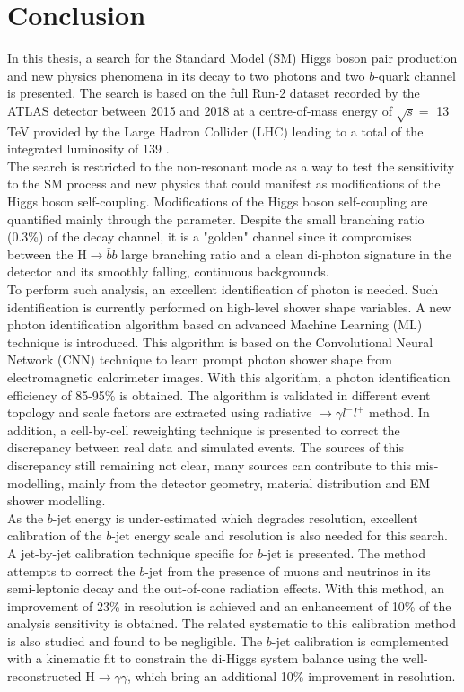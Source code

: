 \newpage
\chapter{Conclusion}

In this thesis, a search for the Standard Model (SM) Higgs boson pair production and new physics phenomena in its decay to two photons and two $b$-quark channel is presented. The search is based on the full Run-2 dataset recorded by the ATLAS detector between 2015 and 2018 at a centre-of-mass energy of $\sqrt{s} = $ 13 TeV provided by the Large Hadron Collider (LHC) leading to a total of the integrated luminosity of 139 \ifb.  \\

The search is restricted to the non-resonant mode as a way to test the sensitivity to the SM process and new physics that could manifest as modifications of the Higgs boson self-coupling. Modifications of the Higgs boson self-coupling are quantified mainly through the \kl parameter. Despite the small branching ratio (0.3\%) of the \bbyy decay channel, it is a "golden" channel since it compromises between the H$\to\bar{b}b$ large branching ratio and a clean di-photon signature in the detector and its smoothly falling, continuous backgrounds. \\

To perform such analysis, an excellent identification of photon is needed. Such identification is currently performed on high-level shower shape variables. A new photon identification algorithm based on advanced Machine Learning (ML) technique is introduced. This algorithm is based on the Convolutional Neural Network (CNN) technique to learn prompt photon shower shape from electromagnetic calorimeter images. With this algorithm, a photon identification efficiency of 85-95\% is obtained. The algorithm is validated in different event topology and scale factors are extracted using radiative $\to\gamma l^-l^+$ method. In addition, a cell-by-cell reweighting technique is presented to correct the discrepancy between real data and simulated events. The sources of this discrepancy still remaining not clear, many sources can contribute to this mis-modelling, mainly from the detector geometry, material distribution and EM shower modelling. \\

As the $b$-jet energy is under-estimated which degrades \mbb resolution, excellent calibration of the $b$-jet energy scale and resolution is also needed for this search. A jet-by-jet calibration technique specific for $b$-jet is presented. The method attempts to correct the $b$-jet from the presence of muons and neutrinos in its semi-leptonic decay and the out-of-cone radiation effects. With this method, an improvement of 23\% in \mbb resolution is achieved and an enhancement of 10\% of the \HHyybb analysis sensitivity is obtained. The related systematic to this calibration method is also studied and found to be negligible. The $b$-jet calibration is complemented with a kinematic fit to constrain the di-Higgs system balance using the well-reconstructed H$\to\gamma\gamma$, which bring an additional 10\% improvement in \mbb resolution. \\

